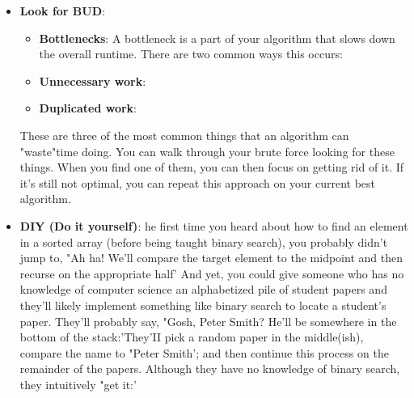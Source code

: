\documentclass{report}
\begin{document}
\begin{itemize}
\begin{enumerate}
                \item \textbf{Hot spots}: You've coded long enough to know what things are likely to cause problems. Base cases in recursive code. Integer division. Null nodes in binary trees. The start and end of iteration through a linked list. Double check that stuff.
                \item \textbf{Small test cases}: This is the first time we use an actual, specific test case to test the code. Don't use that nice, big 8-element array from the algorithm part. Instead, use a 3 or 4 element array. It'll likely discover the same bugs, but it will be much faster to do so.
                \item \textbf{Special cases}: Test your code against null or single element values, the extreme cases, and other special cases.
            \end{enumerate}
            When you find bugs (and you probably will), you should of course fix them. But don't just make the first correction you think of. Instead,carefully analyze why the bug occurred and ensure that your fix is the best one.
        \item \textbf{Look for BUD}: 
            \begin{itemize}
                \item \textbf{Bottlenecks}: A bottleneck is a part of your algorithm that slows down the overall runtime. There are two common ways this occurs:
                \item \textbf{Unnecessary work}:
                \item \textbf{Duplicated work}:
            \end{itemize}
            These are three of the most common things that an algorithm can "waste"time doing. You can walk through your brute force looking for these things. When you find one of them, you can then focus on getting rid of it.
            \bigbreak \noindent 
            If it's still not optimal, you can repeat this approach on your current best algorithm.
        \item \textbf{DIY (Do it yourself)}: he first time you heard about how to find an element in a sorted array (before being taught binary search), you probably didn't jump to, "Ah ha! We'll compare the target element to the midpoint and then recurse on the appropriate half'
            \bigbreak \noindent 
            And yet, you could give someone who has no knowledge of computer science an alphabetized pile of student papers and they'll likely implement something like binary search to locate a student's paper. They'll probably say, "Gosh, Peter Smith? He'll be somewhere in the bottom of the stack:'They'II pick a random paper in the middle(ish), compare the name to "Peter Smith'; and then continue this process on the remainder of the papers. Although they have no knowledge of binary search, they intuitively "get it:'

\end{itemize}
\end{document}
